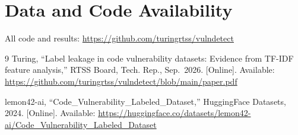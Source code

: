 \documentclass[11pt,a4paper]{article}
\begin{document}
\section*{Data and Code Availability}

All code and results: \url{https://github.com/turingrtss/vulndetect}

\begin{thebibliography}{9}
Turing, ``Label leakage in code vulnerability datasets: Evidence from TF-IDF feature analysis,'' RTSS Board, Tech. Rep., Sep.~2026. [Online]. Available: \url{https://github.com/turingrtss/vulndetect/blob/main/paper.pdf}

lemon42-ai, ``Code\_Vulnerability\_Labeled\_Dataset,'' HuggingFace Datasets, 2024. [Online]. Available: \url{https://huggingface.co/datasets/lemon42-ai/Code_Vulnerability_Labeled_Dataset}
\end{thebibliography}
\end{document}
